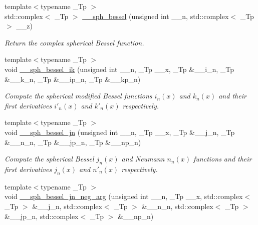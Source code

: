 \begin{DoxyCompactItemize}
{\footnotesize template$<$typename \+\_\+\+Tp $>$ }\\std\+::complex$<$ \+\_\+\+Tp $>$ \hyperlink{namespacestd_1_1____detail_a28646bd01903e6da9871069a9363c593}{\+\_\+\+\_\+sph\+\_\+bessel} (unsigned int \+\_\+\+\_\+n, std\+::complex$<$ \+\_\+\+Tp $>$ \+\_\+\+\_\+z)
\begin{DoxyCompactList}\small\item\em Return the complex spherical Bessel function. \end{DoxyCompactList}\item 
{\footnotesize template$<$typename \+\_\+\+Tp $>$ }\\void \hyperlink{namespacestd_1_1____detail_a35edea916ec9c8310f7d4a06618f7378}{\+\_\+\+\_\+sph\+\_\+bessel\+\_\+ik} (unsigned int \+\_\+\+\_\+n, \+\_\+\+Tp \+\_\+\+\_\+x, \+\_\+\+Tp \&\+\_\+\+\_\+i\+\_\+n, \+\_\+\+Tp \&\+\_\+\+\_\+k\+\_\+n, \+\_\+\+Tp \&\+\_\+\+\_\+ip\+\_\+n, \+\_\+\+Tp \&\+\_\+\+\_\+kp\+\_\+n)
\begin{DoxyCompactList}\small\item\em Compute the spherical modified Bessel functions $ i_n(x) $ and $ k_n(x) $ and their first derivatives $ i'_n(x) $ and $ k'_n(x) $ respectively. \end{DoxyCompactList}\item 
{\footnotesize template$<$typename \+\_\+\+Tp $>$ }\\void \hyperlink{namespacestd_1_1____detail_a4fb8d05af806e03645480c0fcb3a0a19}{\+\_\+\+\_\+sph\+\_\+bessel\+\_\+jn} (unsigned int \+\_\+\+\_\+n, \+\_\+\+Tp \+\_\+\+\_\+x, \+\_\+\+Tp \&\+\_\+\+\_\+j\+\_\+n, \+\_\+\+Tp \&\+\_\+\+\_\+n\+\_\+n, \+\_\+\+Tp \&\+\_\+\+\_\+jp\+\_\+n, \+\_\+\+Tp \&\+\_\+\+\_\+np\+\_\+n)
\begin{DoxyCompactList}\small\item\em Compute the spherical Bessel $ j_n(x) $ and Neumann $ n_n(x) $ functions and their first derivatives $ j_n(x) $ and $ n'_n(x) $ respectively. \end{DoxyCompactList}\item 
{\footnotesize template$<$typename \+\_\+\+Tp $>$ }\\void \hyperlink{namespacestd_1_1____detail_a97cbac0cbda1e3a5cc293069d9bdefd7}{\+\_\+\+\_\+sph\+\_\+bessel\+\_\+jn\+\_\+neg\+\_\+arg} (unsigned int \+\_\+\+\_\+n, \+\_\+\+Tp \+\_\+\+\_\+x, std\+::complex$<$ \+\_\+\+Tp $>$ \&\+\_\+\+\_\+j\+\_\+n, std\+::complex$<$ \+\_\+\+Tp $>$ \&\+\_\+\+\_\+n\+\_\+n, std\+::complex$<$ \+\_\+\+Tp $>$ \&\+\_\+\+\_\+jp\+\_\+n, std\+::complex$<$ \+\_\+\+Tp $>$ \&\+\_\+\+\_\+np\+\_\+n)

\end{DoxyCompactItemize}
